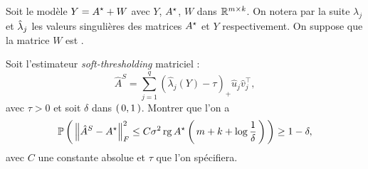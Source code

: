 \begin{exo}
 Soit le modèle $\displaystyle Y = \Aopt + W$ avec $Y$, $\Aopt$, $W$ dans $\mathbb{R}^{
   m\times k}$. On notera par la suite
 $\lambda_j$ et $\hat{\lambda}_j$ les valeurs singulières des matrices $\Aopt$ et $Y$
 respectivement. On suppose que la matrice $W$ est \ssg.

 Soit l'estimateur \textit{soft-thresholding} matriciel :
 $$\hat { A } ^ { S } = \sum _ { j = 1 } ^ { q } \left( \hat { \lambda } _ { j } ( Y ) - \tau \right) _ { + } \hat { u } _ { j } \hat { v } _ { j } ^ { \top },$$
 avec $\tau >0$  et soit $\delta$ dans $\left( \, 0,1 \, \right)$.
 Montrer que l'on a
 $$\Proba{\norme{\Aestim^S - \Aopt}_F^2 \leq C \sigma^2 \rg \Aopt \prt{m+k+\log  \frac{1}{\delta}}} \geq 1- \delta,$$
 avec $C$ une constante absolue et $\tau$ que l'on spécifiera.
\end{exo}

